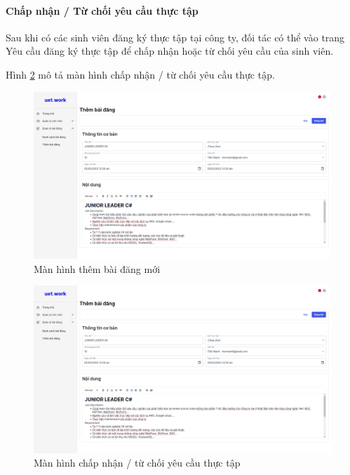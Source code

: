 \documentclass[./../main.tex]{subfiles}
\begin{document}
\paragraph*{Chấp nhận / Từ chối yêu cầu thực tập}

Sau khi có các sinh viên đăng ký thực tập tại công ty, đối tác có thể vào trang Yêu cầu đăng ký thực tập để chấp nhận hoặc từ chối yêu cầu của sinh viên.

Hình \ref{fig:approve_or_reject_request} mô tả màn hình chấp nhận / từ chối yêu cầu thực tập.

\begin{figure}[]
	\includegraphics[width=\linewidth]{./images/image18.png}
	\caption{Màn hình thêm bài đăng mới}
	\label{fig:add_post_page}
\end{figure}

\begin{figure}[]
	\includegraphics[width=\linewidth]{./images/image18.png} %
	\caption{Màn hình chấp nhận / từ chối yêu cầu thực tập }
	\label{fig:approve_or_reject_request}
\end{figure}
\end{document}
